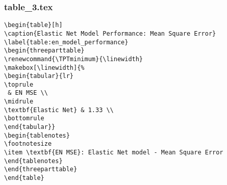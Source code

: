 \documentclass[11pt]{article}
\begin{document}
\subsubsection*{table\_3.tex}

\begin{Verbatim}[tabsize=4]
\begin{table}[h]
\caption{Elastic Net Model Performance: Mean Square Error}
\label{table:en_model_performance}
\begin{threeparttable}
\renewcommand{\TPTminimum}{\linewidth}
\makebox[\linewidth]{%
\begin{tabular}{lr}
\toprule
 & EN MSE \\
\midrule
\textbf{Elastic Net} & 1.33 \\
\bottomrule
\end{tabular}}
\begin{tablenotes}
\footnotesize
\item \textbf{EN MSE}: Elastic Net model - Mean Square Error
\end{tablenotes}
\end{threeparttable}
\end{table}

\end{Verbatim}
\end{document}

